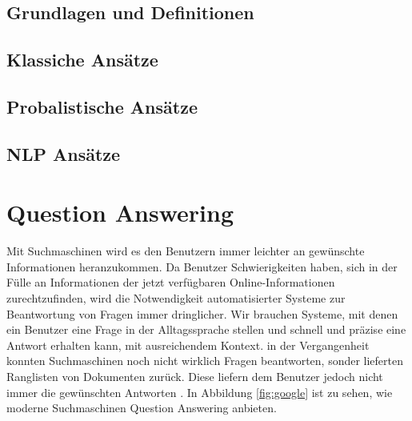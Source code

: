 \documentclass[
        ngerman,
        paper=a4,
        numbers=noendperiod,
]{scrreprt}
\begin{document}
\subsection{Grundlagen und Definitionen}
\subsection{Klassiche Ansätze}
\subsection{Probalistische Ansätze}
\subsection{NLP Ansätze}

\section{Question Answering} 

    
Mit Suchmaschinen wird es den Benutzern immer leichter an gewünschte Informationen heranzukommen. Da Benutzer Schwierigkeiten haben, sich in der Fülle an Informationen der jetzt verfügbaren Online-Informationen zurechtzufinden, wird die Notwendigkeit automatisierter Systeme zur Beantwortung von Fragen immer dringlicher. Wir brauchen Systeme, mit denen ein Benutzer eine Frage in der Alltagssprache stellen und schnell und präzise eine Antwort erhalten kann, mit ausreichendem Kontext. in der Vergangenheit konnten Suchmaschinen noch nicht wirklich Fragen beantworten, sonder lieferten Ranglisten von Dokumenten zurück. Diese liefern dem Benutzer jedoch nicht immer die gewünschten Antworten \citep[S. 275]{Hirschman2001NaturalHere}. In Abbildung \ref{fig:google} ist zu sehen, wie moderne Suchmaschinen Question Answering anbieten.
\end{document}
